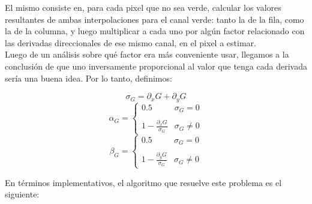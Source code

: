 \documentclass[a4paper]{article}
\begin{document}
El mismo consiste en, para cada pixel que no sea verde, calcular los valores resultantes de ambas interpolaciones para el canal verde: tanto la de la fila, como la de la columna, y luego multiplicar a cada uno por algún factor relacionado con las derivadas direccionales de ese mismo canal, en el pixel a estimar.\\

Luego de un análisis sobre qué factor era más conveniente usar, llegamos a la conclusión de que uno inversamente proporcional al valor que tenga cada derivada sería una buena idea. Por lo tanto, definimos:

\[\sigma_G = \partial_xG + \partial_yG \]
\smallskip
\[\alpha_G = 
\begin{cases}
0.5 & \sigma_G = 0 \\
  &  \\
1-\frac{\partial_xG}{\sigma_G} & \sigma_G \neq 0
\end{cases}
\]
\medskip
\[\beta_G = 
\begin{cases}
0.5 & \sigma_G = 0 \\
  &  \\
1-\frac{\partial_yG}{\sigma_G} & \sigma_G \neq 0
\end{cases}
\]
\pagebreak

En términos implementativos, el algoritmo que resuelve este problema es el siguiente:
\end{document}
